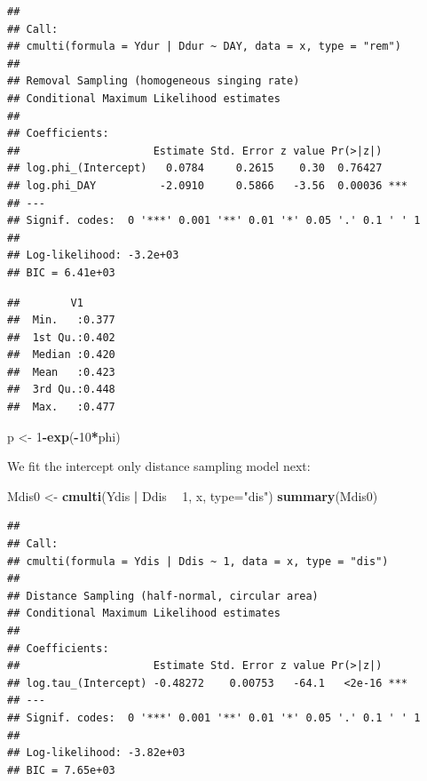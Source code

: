 \documentclass[12pt,]{book}
\newenvironment{Shaded}{\begin{snugshade}}{\end{snugshade}}
\newcommand{\DataTypeTok}[1]{\textcolor[rgb]{0.13,0.29,0.53}{#1}}
\newcommand{\DecValTok}[1]{\textcolor[rgb]{0.00,0.00,0.81}{#1}}
\newcommand{\KeywordTok}[1]{\textcolor[rgb]{0.13,0.29,0.53}{\textbf{#1}}}
\newcommand{\NormalTok}[1]{#1}
\newcommand{\OperatorTok}[1]{\textcolor[rgb]{0.81,0.36,0.00}{\textbf{#1}}}
\newcommand{\StringTok}[1]{\textcolor[rgb]{0.31,0.60,0.02}{#1}}
\begin{document}
\begin{verbatim}
## 
## Call:
## cmulti(formula = Ydur | Ddur ~ DAY, data = x, type = "rem")
## 
## Removal Sampling (homogeneous singing rate)
## Conditional Maximum Likelihood estimates
## 
## Coefficients:
##                     Estimate Std. Error z value Pr(>|z|)    
## log.phi_(Intercept)   0.0784     0.2615    0.30  0.76427    
## log.phi_DAY          -2.0910     0.5866   -3.56  0.00036 ***
## ---
## Signif. codes:  0 '***' 0.001 '**' 0.01 '*' 0.05 '.' 0.1 ' ' 1 
## 
## Log-likelihood: -3.2e+03 
## BIC = 6.41e+03
\end{verbatim}

\begin{Shaded}
\end{Shaded}

\begin{verbatim}
##        V1       
##  Min.   :0.377  
##  1st Qu.:0.402  
##  Median :0.420  
##  Mean   :0.423  
##  3rd Qu.:0.448  
##  Max.   :0.477
\end{verbatim}

\begin{Shaded}
\begin{Highlighting}[]
\NormalTok{p <-}\StringTok{ }\DecValTok{1}\OperatorTok{-}\KeywordTok{exp}\NormalTok{(}\OperatorTok{-}\DecValTok{10}\OperatorTok{*}\NormalTok{phi)}
\end{Highlighting}
\end{Shaded}

We fit the intercept only distance sampling model next:

\begin{Shaded}
\begin{Highlighting}[]
\NormalTok{Mdis0 <-}\StringTok{ }\KeywordTok{cmulti}\NormalTok{(Ydis }\OperatorTok{|}\StringTok{ }\NormalTok{Ddis }\OperatorTok{~}\StringTok{ }\DecValTok{1}\NormalTok{, x, }\DataTypeTok{type=}\StringTok{"dis"}\NormalTok{)}
\KeywordTok{summary}\NormalTok{(Mdis0)}
\end{Highlighting}
\end{Shaded}

\begin{verbatim}
## 
## Call:
## cmulti(formula = Ydis | Ddis ~ 1, data = x, type = "dis")
## 
## Distance Sampling (half-normal, circular area)
## Conditional Maximum Likelihood estimates
## 
## Coefficients:
##                     Estimate Std. Error z value Pr(>|z|)    
## log.tau_(Intercept) -0.48272    0.00753   -64.1   <2e-16 ***
## ---
## Signif. codes:  0 '***' 0.001 '**' 0.01 '*' 0.05 '.' 0.1 ' ' 1 
## 
## Log-likelihood: -3.82e+03 
## BIC = 7.65e+03
\end{verbatim}
\end{document}
